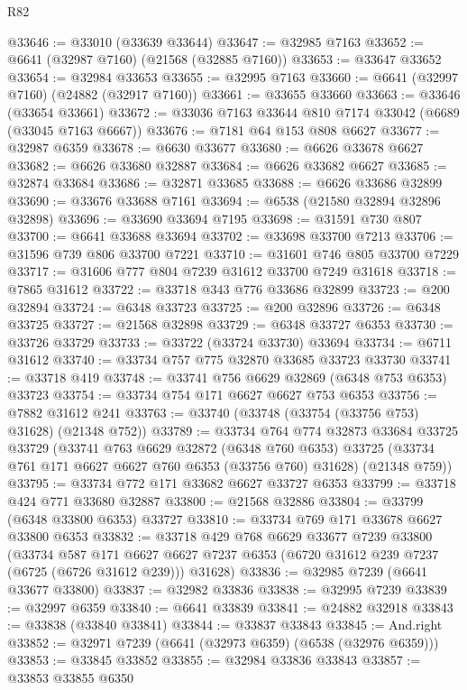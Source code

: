 \begin{lexlean}{R82}
\begin{coremodule}
@33646 := @33010 (@33639 @33644)
@33647 := @32985 @7163
@33652 := @6641 (@32987 @7160) (@21568 (@32885 @7160))
@33653 := @33647 @33652
@33654 := @32984 @33653
@33655 := @32995 @7163
@33660 := @6641 (@32997 @7160) (@24882 (@32917 @7160))
@33661 := @33655 @33660
@33663 := @33646 (@33654 @33661)
@33672 := @33036 @7163 @33644 @810 @7174 @33042 (@6689 (@33045 @7163 @6667))
@33676 := @7181 @64 @153 @808 @6627
@33677 := @32987 @6359
@33678 := @6630 @33677
@33680 := @6626 @33678 @6627
@33682 := @6626 @33680 @32887
@33684 := @6626 @33682 @6627
@33685 := @32874 @33684
@33686 := @32871 @33685
@33688 := @6626 @33686 @32899
@33690 := @33676 @33688 @7161
@33694 := @6538 (@21580 @32894 @32896 @32898)
@33696 := @33690 @33694 @7195
@33698 := @31591 @730 @807
@33700 := @6641 @33688 @33694
@33702 := @33698 @33700 @7213
@33706 := @31596 @739 @806 @33700 @7221
@33710 := @31601 @746 @805 @33700 @7229
@33717 := @31606 @777 @804 @7239 @31612 @33700 @7249 @31618
@33718 := @7865 @31612
@33722 := @33718 @343 @776 @33686 @32899
@33723 := @200 @32894
@33724 := @6348 @33723
@33725 := @200 @32896
@33726 := @6348 @33725
@33727 := @21568 @32898
@33729 := @6348 @33727 @6353
@33730 := @33726 @33729
@33733 := @33722 (@33724 @33730) @33694
@33734 := @6711 @31612
@33740 := @33734 @757 @775 @32870 @33685 @33723 @33730
@33741 := @33718 @419
@33748 := @33741 @756 @6629 @32869 (@6348 @753 @6353) @33723
@33754 := @33734 @754 @171 @6627 @6627 @753 @6353
@33756 := @7882 @31612 @241
@33763 := @33740 (@33748 (@33754 (@33756 @753) @31628) (@21348 @752))
@33789 := @33734
    @764
    @774
    @32873
    @33684
    @33725
    @33729
    (@33741
      @763
      @6629
      @32872
      (@6348 @760 @6353)
      @33725
      (@33734 @761 @171 @6627 @6627 @760 @6353 (@33756 @760) @31628)
      (@21348 @759))
@33795 := @33734 @772 @171 @33682 @6627 @33727 @6353
@33799 := @33718 @424 @771 @33680 @32887
@33800 := @21568 @32886
@33804 := @33799 (@6348 @33800 @6353) @33727
@33810 := @33734 @769 @171 @33678 @6627 @33800 @6353
@33832 := @33718
    @429
    @768
    @6629
    @33677
    @7239
    @33800
    (@33734
      @587
      @171
      @6627
      @6627
      @7237
      @6353
      (@6720 @31612 @239 @7237 (@6725 (@6726 @31612 @239)))
      @31628)
@33836 := @32985 @7239 (@6641 @33677 @33800)
@33837 := @32982 @33836
@33838 := @32995 @7239
@33839 := @32997 @6359
@33840 := @6641 @33839
@33841 := @24882 @32918
@33843 := @33838 (@33840 @33841)
@33844 := @33837 @33843
@33845 := And.right
@33852 := @32971 @7239 (@6641 (@32973 @6359) (@6538 (@32976 @6359)))
@33853 := @33845 @33852
@33855 := @32984 @33836 @33843
@33857 := @33853 @33855 @6350

\end{coremodule}
\end{lexlean}
